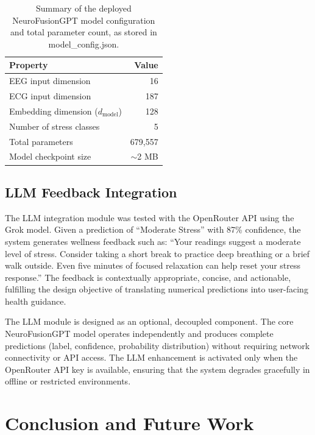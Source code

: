\documentclass[12pt,letterpaper]{report}
\begin{document}
\begin{table}[H]
\centering
\caption[Model architecture summary]{Summary of the deployed NeuroFusionGPT model configuration and total parameter count, as stored in model\_config.json.}
\label{tab:model_summary}
\begin{tabular}{lr}
\toprule
\textbf{Property} & \textbf{Value} \\
\midrule
EEG input dimension & 16 \\
ECG input dimension & 187 \\
Embedding dimension ($d_{\text{model}}$) & 128 \\
Number of stress classes & 5 \\
Total parameters & 679,557 \\
Model checkpoint size & $\sim$2 MB \\
\bottomrule
\end{tabular}
\end{table}

\section{LLM Feedback Integration}
\label{sec:llm_results}

The LLM integration module was tested with the OpenRouter API using the Grok model. Given a prediction of ``Moderate Stress'' with 87\% confidence, the system generates wellness feedback such as: ``Your readings suggest a moderate level of stress. Consider taking a short break to practice deep breathing or a brief walk outside. Even five minutes of focused relaxation can help reset your stress response.'' The feedback is contextually appropriate, concise, and actionable, fulfilling the design objective of translating numerical predictions into user-facing health guidance.

The LLM module is designed as an optional, decoupled component. The core NeuroFusionGPT model operates independently and produces complete predictions (label, confidence, probability distribution) without requiring network connectivity or API access. The LLM enhancement is activated only when the OpenRouter API key is available, ensuring that the system degrades gracefully in offline or restricted environments.


\clearpage
\chapter{Conclusion and Future Work}
\label{ch:conclusion}
\end{document}
